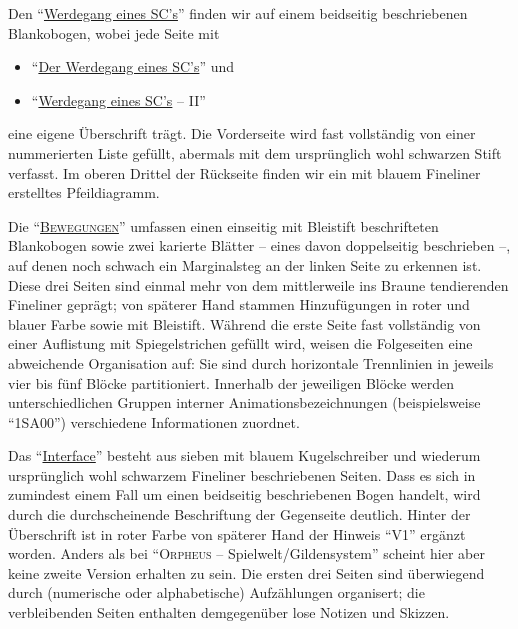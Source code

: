 \documentclass[a5paper,pagesize,numbers=noenddot]{scrbook}
\begin{document}
Den \enquote{\uline{Werdegang eines SC's}} finden wir auf einem beidseitig beschriebenen Blankobogen, wobei jede Seite mit

\begin{itemize}
   \item \enquote{\uline{Der Werdegang eines SC's}} und
   \item \enquote{\uline{Werdegang eines SC's} -- II}
\end{itemize}

\noindent eine eigene Überschrift trägt.
Die Vorderseite wird fast vollständig von einer nummerierten Liste gefüllt, abermals mit dem ursprünglich wohl schwarzen Stift verfasst.
Im oberen Drittel der Rückseite finden wir ein mit blauem Fineliner erstelltes Pfeildiagramm.


Die \enquote{\uline{\textsc{Bewegungen}}} umfassen einen einseitig mit Bleistift beschrifteten Blankobogen sowie zwei karierte Blätter -- eines davon doppelseitig beschrieben --, auf denen noch schwach ein Marginalsteg an der linken Seite zu erkennen ist.
Diese drei Seiten sind einmal mehr von dem mittlerweile ins Braune tendierenden Fineliner geprägt; von späterer Hand stammen Hinzufügungen in roter und blauer Farbe sowie mit Bleistift.
Während die erste Seite fast vollständig von einer Auflistung mit Spiegelstrichen gefüllt wird, weisen die Folgeseiten eine abweichende Organisation auf:
Sie sind durch horizontale Trennlinien in jeweils vier bis fünf Blöcke partitioniert.
Innerhalb der jeweiligen Blöcke werden unterschiedlichen Gruppen interner Animationsbezeichnungen (beispielsweise \enquote{1SA00}) verschiedene Informationen zuordnet.


Das \enquote{\uline{Interface}} besteht aus sieben mit blauem Kugelschreiber und wiederum ursprünglich wohl schwarzem Fineliner beschriebenen Seiten.
Dass es sich in zumindest einem Fall um einen beidseitig beschriebenen Bogen handelt, wird durch die durchscheinende Beschriftung der Gegenseite deutlich.
Hinter der Überschrift ist in roter Farbe von späterer Hand der Hinweis \enquote{V1} ergänzt worden.
Anders als bei \enquote{\textsc{Orpheus} -- Spielwelt/Gildensystem} scheint hier aber keine zweite Version erhalten zu sein. %
Die ersten drei Seiten sind überwiegend durch (numerische oder alphabetische) Aufzählungen organisert; die verbleibenden Seiten enthalten demgegenüber lose Notizen und Skizzen.
\end{document}
